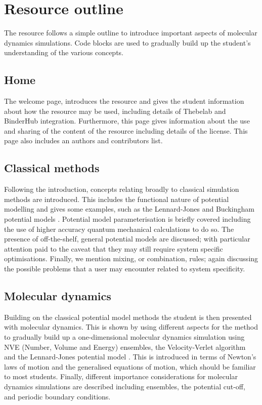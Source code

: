 \documentclass[amsmath,amssymb,twocolumn,superscriptaddress]{revtex4-1}
\begin{document}
\section{Resource outline}

The resource follows a simple outline to introduce important aspects of molecular dynamics simulations.
Code blocks are used to gradually build up the student's understanding of the various concepts.

\subsection{Home}

The welcome page, introduces the resource and gives the student information about how the resource may be used, including details of Thebelab and BinderHub integration.
Furthermore, this page gives information about the use and sharing of the content of the resource including details of the license.
This page also includes an authors and contributors list.

\subsection{Classical methods}

Following the introduction, concepts relating broadly to classical simulation methods are introduced.
This includes the functional nature of potential modelling and gives some examples, such as the Lennard-Jones and Buckingham potential models \cite{lennard-jones_determination_1924,buckingham_classical_1938}.
Potential model parameterisation is briefly covered including the use of higher accuracy quantum mechanical calculations to do so.
The presence of off-the-shelf, general potential models are discussed; with particular attention paid to the caveat that they may still require system specific optimisations.
Finally, we mention mixing, or combination, rules; again discussing the possible problems that a user may encounter related to system specificity.

\subsection{Molecular dynamics}

Building on the classical potential model methods the student is then presented with molecular dynamics.
This is shown by using different aspects for the method to gradually build up a one-dimensional molecular dynamics simulation using NVE (Number, Volume and Energy) ensembles, the Velocity-Verlet algorithm and the Lennard-Jones potential model \cite{swope_computer_1982,lennard-jones_determination_1924}.
This is introduced in terms of Newton's laws of motion and the generalised equations of motion, which should be familiar to most students.
Finally, different importance considerations for molecular dynamics simulations are described including ensembles, the potential cut-off, and periodic boundary conditions.
\end{document}
